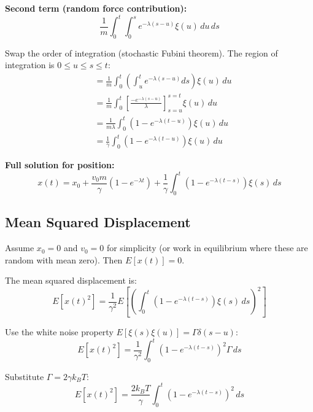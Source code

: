 \documentclass[11pt,a4paper]{article}
\begin{document}
	\textbf{Second term (random force contribution):}
	\begin{equation}
		\frac{1}{m} \int_0^t \int_0^s e^{-\lambda(s-u)} \xi(u) \, du \, ds
	\end{equation}
	
	Swap the order of integration (stochastic Fubini theorem). The region of integration is $0 \leq u \leq s \leq t$:
	\begin{align}
		&= \frac{1}{m} \int_0^t \left( \int_u^t e^{-\lambda(s-u)} ds \right) \xi(u) \, du \\
		&= \frac{1}{m} \int_0^t \left[ \frac{-e^{-\lambda(s-u)}}{\lambda} \right]_{s=u}^{s=t} \xi(u) \, du \\
		&= \frac{1}{m\lambda} \int_0^t \left(1 - e^{-\lambda(t-u)}\right) \xi(u) \, du \\
		&= \frac{1}{\gamma} \int_0^t \left(1 - e^{-\lambda(t-u)}\right) \xi(u) \, du
	\end{align}
	
	\textbf{Full solution for position:}
	\begin{equation}
		x(t) = x_0 + \frac{v_0 m}{\gamma}\left(1 - e^{-\lambda t}\right) + \frac{1}{\gamma} \int_0^t \left(1 - e^{-\lambda(t-s)}\right) \xi(s) \, ds
	\end{equation}
	
	\subsection{Mean Squared Displacement}
	
	Assume $x_0 = 0$ and $v_0 = 0$ for simplicity (or work in equilibrium where these are random with mean zero). Then $E[x(t)] = 0$.
	
	The mean squared displacement is:
	\begin{equation}
		E[x(t)^2] = \frac{1}{\gamma^2} E\left[ \left( \int_0^t (1 - e^{-\lambda(t-s)}) \xi(s) \, ds \right)^2 \right]
	\end{equation}
	
	Use the white noise property $E[\xi(s)\xi(u)] = \Gamma \delta(s-u)$:
	\begin{equation}
		E[x(t)^2] = \frac{1}{\gamma^2} \int_0^t (1 - e^{-\lambda(t-s)})^2 \Gamma \, ds
	\end{equation}
	
	Substitute $\Gamma = 2\gamma k_B T$:
	\begin{equation}
		E[x(t)^2] = \frac{2 k_B T}{\gamma} \int_0^t (1 - e^{-\lambda(t-s)})^2 \, ds
	\end{equation}
	
\end{document}
